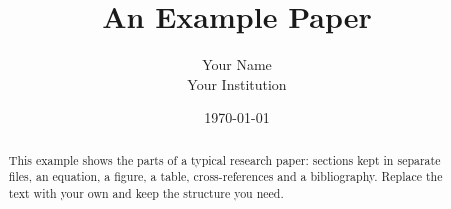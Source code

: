 \documentclass[11pt]{article}
\title{An Example Paper}
\author{Your Name\\Your Institution}
\date{\today}
\begin{document}
\maketitle

\begin{abstract}
This example shows the parts of a typical research paper: sections kept in
separate files, an equation, a figure, a table, cross-references and a
bibliography. Replace the text with your own and keep the structure you need.
\end{abstract}








\end{document}
